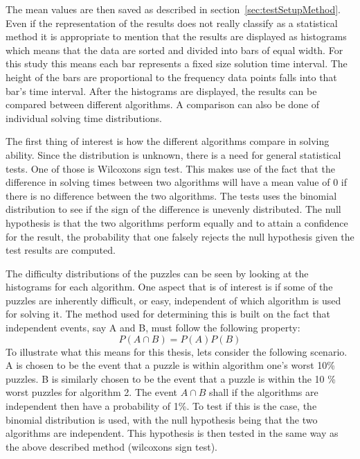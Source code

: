 \documentclass[a4paper,11pt]{kth-mag}
\begin{document}
The mean values are then saved as described in section~\ref{sec:testSetupMethod}.
Even if the representation of the results does not really classify as a statistical method it is appropriate to mention that the results are displayed as histograms which means that the data are sorted and divided into bars of equal width. 
For this study this means each bar represents a fixed size solution time interval. 
The height of the bars are proportional to the frequency data points falls into that bar's time interval.
After the histograms are displayed, the results can be compared between different algorithms.
A comparison can also be done of individual solving time distributions.

The first thing of interest is how the different algorithms compare in solving ability. 
Since the distribution is unknown, there is a need for general statistical tests. 
One of those is Wilcoxons sign test. 
This makes use of the fact that the difference in solving times between two algorithms will have a mean value of 0 if there is no difference between the two algorithms. 
The tests uses the binomial distribution to see if the sign of the difference is unevenly distributed.
The null hypothesis is that the two algorithms perform equally and to attain a confidence for the result, the probability that one falsely rejects the null hypothesis given the test results are computed.

The difficulty distributions of the puzzles can be seen by looking at the histograms for each algorithm.
One aspect that is of interest is if some of the puzzles are inherently difficult, or easy, independent of which algorithm is used for solving it.
The method used for determining this is built on the fact that independent events, say A and B, must follow the following property:
\[
P(A \cap B) = P(A) P(B)
\] 
To illustrate what this means for this thesis, lets consider the following scenario.
A is chosen to be the event that a puzzle is within algorithm one's worst 10\% puzzles.
B is similarly chosen to be the event that a puzzle is within the 10 \% worst puzzles for algorithm 2.
The event $A \cap B$ shall if the algorithms are independent then have a probability of 1\%.
To test if this is the case, the binomial distribution is used, with the null hypothesis being that the two algorithms are independent.
This hypothesis is then tested in the same way as the above described method (wilcoxons sign test).

\FloatBarrier
\end{document}
